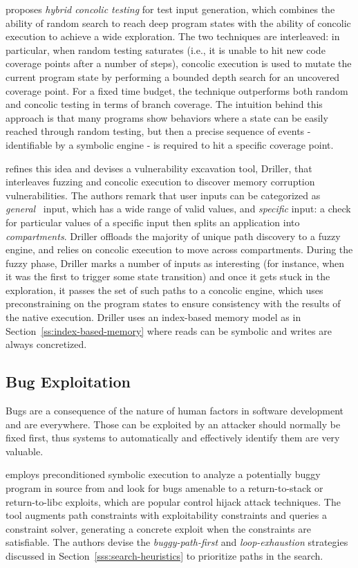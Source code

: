 \cite{RK-ICSE07} proposes {\em hybrid concolic testing} for test input generation, which combines the ability of random search to reach deep program states with the ability of concolic execution to achieve a wide exploration. The two techniques are interleaved: in particular, when random testing saturates (i.e., it is unable to hit new code coverage points after a number of steps), concolic execution is used to mutate the current program state by performing a bounded depth search for an uncovered coverage point. For a fixed time budget, the technique outperforms both random and concolic testing in terms of branch coverage. The intuition behind this approach is that many programs show behaviors where a state can be easily reached through random testing, but then a precise sequence of events - identifiable by a symbolic engine - is required to hit a specific coverage point.

\cite{DRILLER-NDSS16} refines this idea and devises a vulnerability excavation tool, Driller, that interleaves fuzzing and concolic execution to discover memory corruption vulnerabilities. The authors remark that user inputs can be categorized as {\em general}  input, which has a wide range of valid values, and {\em specific} input: a check for particular values of a specific input then splits an application into {\em compartments}. Driller offloads the majority of unique path discovery to a fuzzy engine, and relies on concolic execution to move across compartments. During the fuzzy phase, Driller marks a number of inputs as interesting (for instance, when it was the first to trigger some state transition) and once it gets stuck in the exploration, it passes the set of such paths to a concolic engine, which uses preconstraining on the program states to ensure consistency with the results of the native execution. Driller uses an index-based memory model as in Section~\ref{ss:index-based-memory} where reads can be symbolic and writes are always concretized. %

\subsection{Bug Exploitation}
\label{ss:bug-exploitation}
Bugs are a consequence of the nature of human factors in software development and are everywhere. Those can be exploited by an attacker should normally be fixed first, thus systems to automatically and effectively identify them are very valuable.

\cite{AEG-NDSS11} employs preconditioned symbolic execution to analyze a potentially buggy program in source from and look for bugs amenable to a return-to-stack or return-to-libc exploits, which are popular control hijack attack techniques. The tool augments path constraints with exploitability constraints and queries a constraint solver, generating a concrete exploit when the constraints are satisfiable. The authors devise the {\em buggy-path-first} and {\em loop-exhaustion} strategies discussed in Section~\ref{sss:search-heuristics} to prioritize paths in the search. 

